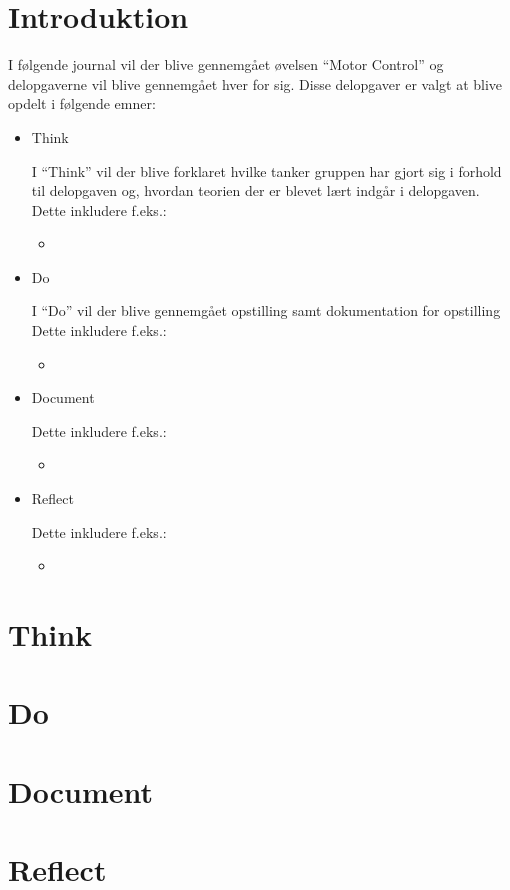 \documentclass{article}
\begin{document}
\section{Introduktion}
I følgende journal vil der blive gennemgået øvelsen ``Motor Control'' og delopgaverne vil blive gennemgået hver for sig. Disse delopgaver er valgt at blive opdelt i følgende emner:
\begin{itemize}
\item Think

I ``Think'' vil der blive forklaret hvilke tanker gruppen har gjort sig i forhold til delopgaven og, hvordan teorien der er blevet lært indgår i delopgaven.\\
Dette inkludere f.eks.:
\begin{itemize}
\item
\end{itemize}

\item Do

I ``Do'' vil der blive gennemgået opstilling samt dokumentation for opstilling
Dette inkludere f.eks.:
\begin{itemize}
\item
\end{itemize}



\item Document


Dette inkludere f.eks.:
\begin{itemize}
\item
\end{itemize}


\item Reflect


Dette inkludere f.eks.:
\begin{itemize}
\item
\end{itemize}


\end{itemize}


\section{Think}


\section{Do}


\section{Document}


\section{Reflect}
\end{document}
